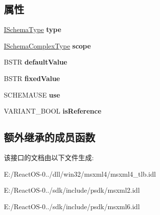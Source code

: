 \subsection*{属性}
\begin{DoxyCompactItemize}
\item 
\mbox{\label{interface_m_s_x_m_l2_1_1_i_schema_attribute_ad88d5d9292c495e566520083d451066b}} 
\hyperlink{interface_m_s_x_m_l2_1_1_i_schema_type}{I\+Schema\+Type} {\bfseries type}
\item 
\mbox{\label{interface_m_s_x_m_l2_1_1_i_schema_attribute_ab1182ac64aa05a94f1c1c723df9310d2}} 
\hyperlink{interface_m_s_x_m_l2_1_1_i_schema_complex_type}{I\+Schema\+Complex\+Type} {\bfseries scope}
\item 
\mbox{\label{interface_m_s_x_m_l2_1_1_i_schema_attribute_afa626a2264ba077bd1cbb08bcdd88845}} 
B\+S\+TR {\bfseries default\+Value}
\item 
\mbox{\label{interface_m_s_x_m_l2_1_1_i_schema_attribute_a7dd9a220b9288cd8d9f1ca12b29f46ac}} 
B\+S\+TR {\bfseries fixed\+Value}
\item 
\mbox{\label{interface_m_s_x_m_l2_1_1_i_schema_attribute_a80b53d77c72f8546e2b9aaa2cd1f36d4}} 
S\+C\+H\+E\+M\+A\+U\+SE {\bfseries use}
\item 
\mbox{\label{interface_m_s_x_m_l2_1_1_i_schema_attribute_a1c5ad46922c183433157d044fca8ade5}} 
V\+A\+R\+I\+A\+N\+T\+\_\+\+B\+O\+OL {\bfseries is\+Reference}
\end{DoxyCompactItemize}
\subsection*{额外继承的成员函数}


该接口的文档由以下文件生成\+:\begin{DoxyCompactItemize}
\item 
E\+:/\+React\+O\+S-\/0../dll/win32/msxml4/msxml4\+\_\+tlb.\+idl\item 
E\+:/\+React\+O\+S-\/0../sdk/include/psdk/msxml2.\+idl\item 
E\+:/\+React\+O\+S-\/0../sdk/include/psdk/msxml6.\+idl\end{DoxyCompactItemize}
